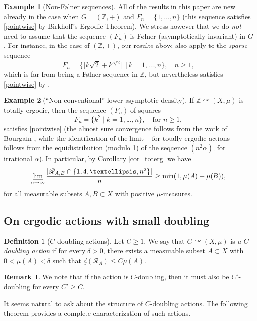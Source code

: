 \documentclass[11pt]{article}
\newcommand{\Subsection}{\subsection}
\numberwithin{equation}{section}
\let\mathcal\mathscr
\newcommand{\cR}{\mathcal{R}}
\newcommand{\bZ}{\mathbb{Z}}
\let\acts\curvearrowright
\theoremstyle{plain}
\theoremstyle{definition}
\newtheorem{definition}[theorem]{Definition}
\newtheorem{remark}[theorem]{Remark}
\newtheorem{example}{Example}[section]
\begin{document}
\begin{example}[Non-F\o lner sequences]
All of the results in this paper are new already in the case when $G = (\bZ,+)$ and $F_n = \{1,\ldots,n\}$ (this sequence satisfies \eqref{pointwise} by Birkhoff's Ergodic Theorem). We stress however that
we do \emph{not} need to assume that the sequence $(F_n)$ is F\o lner (asymptotically invariant) in $G$. For instance, in the case of $(\bZ,+)$, our results above also apply to the \emph{sparse} sequence
\[
F_n = \bigl\{ \lfloor k \sqrt{2} + k^{5/2} \rfloor \mid  k = 1,\ldots,n \bigr\}, \quad \textrm{$n \geq 1$},
\]
which is far from being a F\o lner sequence in $\bZ$, but nevertheless satisfies \eqref{pointwise} by \cite{BW}.
\end{example}

\begin{example}[``Non-conventional'' lower asymptotic density]
If $\bZ \acts (X,\mu)$ is totally ergodic, then the sequence $(F_n)$ of squares
\[
F_n = \{ k^2 \mid k = 1,\ldots,n\}, \quad \textrm{for $n \geq 1$},
\]
satisfies \eqref{pointwise} (the almost sure convergence follows from the work of Bourgain \cite{Bo88}, while the identification of the limit -- for totally ergodic actions -- follows from the equidistribution (modulo 1) of the sequence $(n^2 \alpha)$, for irrational $\alpha$). In particular, by Corollary \ref{cor_toterg} we have
\[
\varliminf_{n \to \infty} \frac{|\cR_{A,B} \cap \{1,4,\ldots,n^2\}|}{n} \geq \min(1,\mu(A) + \mu(B)),
\]
for all measurable subsets $A, B \subset X$ with positive $\mu$-measures.
\end{example}

\Subsection{On ergodic actions with small doubling}

\begin{definition}[$C$\nobreakdash-doubling actions]
Let $C \geq 1$. We say that $G \acts (X,\mu)$ is \emph{a $C$\nobreakdash-doubling action} if for every $\delta > 0$, there
exists a measurable subset $A \subset X$ with $0 < \mu(A) < \delta$ such that $\underline{d}(\cR_A) \leq C\mu(A)$.
\end{definition}

\begin{remark}
We note that if the action is $C$\nobreakdash-doubling, then it must also be $C'$\nobreakdash-doubling for every $C' \geq C$.
\end{remark}

It seems natural to ask about the structure of $C$\nobreakdash-doubling actions. The following theorem provides a complete
characterization of such actions.
\end{document}
